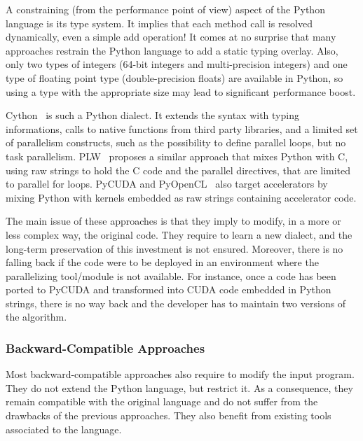 \documentclass{llncs}
\begin{document}
A constraining (from the performance point of view) aspect of the Python
language is its type system. It implies that each method call is resolved
dynamically, even a simple add operation! It comes at no surprise that many
approaches restrain the Python language to add a static typing overlay.  Also,
only two types of integers (64-bit integers and multi-precision integers) and
one type of floating point type (double-precision floats) are available in
Python, so using a type with the appropriate size may lead to significant
performance boost.

Cython~\cite{cython2010} is such a Python dialect. It extends the syntax with
typing informations, calls to native functions from third party libraries, and a
limited set of parallelism constructs, such as the possibility to define
parallel loops, but no task parallelism. PLW~\cite{dongara2007} proposes a
similar approach that mixes Python with C, using raw strings to hold the C code
and the parallel directives, that are limited to parallel for loops.
PyCUDA and PyOpenCL~\cite{klockner2012} also target accelerators by mixing
Python with kernels embedded as raw strings containing accelerator code.

The main issue of these approaches is that they imply to modify, in a more or
less complex way, the original code. They require to learn a new dialect,
and the long-term preservation of this investment is not ensured. Moreover,
there is no falling back if the code were to be deployed in an environment
where the parallelizing tool/module is not available. For instance, once a code
has been ported to PyCUDA and transformed into CUDA code embedded in Python
strings, there is no way back and the developer has to maintain two versions of
the algorithm.

\subsubsection{Backward-Compatible Approaches}

Most backward-compatible approaches also require to modify the input program.
They do not extend the Python language, but restrict it. As a consequence, they
remain compatible with the original language and do not suffer from the
drawbacks of the previous approaches. They also benefit from existing tools
associated to the language.
\end{document}
